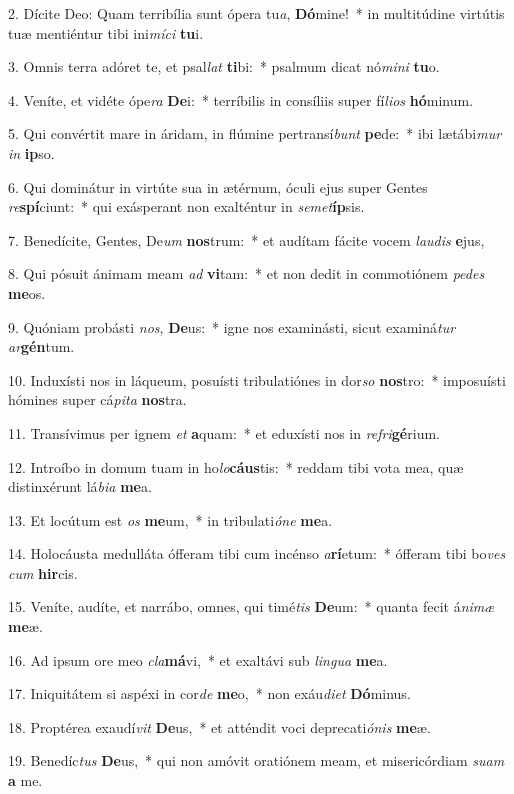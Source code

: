 2. Dícite Deo: Quam terribília sunt ópera tu\textit{a}, \textbf{Dó}mine!~*  in multitúdine virtútis tuæ mentiéntur tibi ini\textit{mí}\textit{ci} \textbf{tu}i.\

3. Omnis terra adóret te, et psal\textit{lat} \textbf{ti}bi:~*  psalmum dicat nó\textit{mi}\textit{ni} \textbf{tu}o.\

4. Veníte, et vidéte ópe\textit{ra} \textbf{De}i:~*  terríbilis in consíliis super fí\textit{li}\textit{os} \textbf{hó}minum.\

5. Qui convértit mare in áridam, in flúmine pertransí\textit{bunt} \textbf{pe}de:~*  ibi lætábi\textit{mur} \textit{in} \textbf{ip}so.\

6. Qui dominátur in virtúte sua in ætérnum, óculi ejus super Gentes \textit{re}\textbf{spí}ciunt:~*  qui exásperant non exalténtur in \textit{se}\textit{met}\textbf{íp}sis.\

7. Benedícite, Gentes, De\textit{um} \textbf{nos}trum:~*  et audítam fácite vocem \textit{lau}\textit{dis} \textbf{e}jus,\

8. Qui pósuit ánimam meam \textit{ad} \textbf{vi}tam:~*  et non dedit in commotiónem \textit{pe}\textit{des} \textbf{me}os.\

9. Quóniam probásti \textit{nos}, \textbf{De}us:~*  igne nos examinásti, sicut examiná\textit{tur} \textit{ar}\textbf{gén}tum.\

10. Induxísti nos in láqueum, posuísti tribulatiónes in dor\textit{so} \textbf{nos}tro:~*  imposuísti hómines super cá\textit{pi}\textit{ta} \textbf{nos}tra.\

11. Transívimus per ignem \textit{et} \textbf{a}quam:~*  et eduxísti nos in \textit{re}\textit{fri}\textbf{gé}rium.\

12. Introíbo in domum tuam in ho\textit{lo}\textbf{cáus}tis:~*  reddam tibi vota mea, quæ distinxérunt lá\textit{bi}\textit{a} \textbf{me}a.\

13. Et locútum est \textit{os} \textbf{me}um,~*  in tribulati\textit{ó}\textit{ne} \textbf{me}a.\

14. Holocáusta medulláta ófferam tibi cum incénso \textit{a}\textbf{rí}etum:~*  ófferam tibi bo\textit{ves} \textit{cum} \textbf{hir}cis.\

15. Veníte, audíte, et narrábo, omnes, qui timé\textit{tis} \textbf{De}um:~*  quanta fecit á\textit{ni}\textit{mæ} \textbf{me}æ.\

16. Ad ipsum ore meo \textit{cla}\textbf{má}vi,~*  et exaltávi sub \textit{lin}\textit{gua} \textbf{me}a.\

17. Iniquitátem si aspéxi in cor\textit{de} \textbf{me}o,~*  non exáu\textit{di}\textit{et} \textbf{Dó}minus.\

18. Proptérea exaudí\textit{vit} \textbf{De}us,~*  et atténdit voci deprecati\textit{ó}\textit{nis} \textbf{me}æ.\

19. Benedíc\textit{tus} \textbf{De}us,~*  qui non amóvit oratiónem meam, et misericórdiam \textit{su}\textit{am} \textbf{a} me.\

